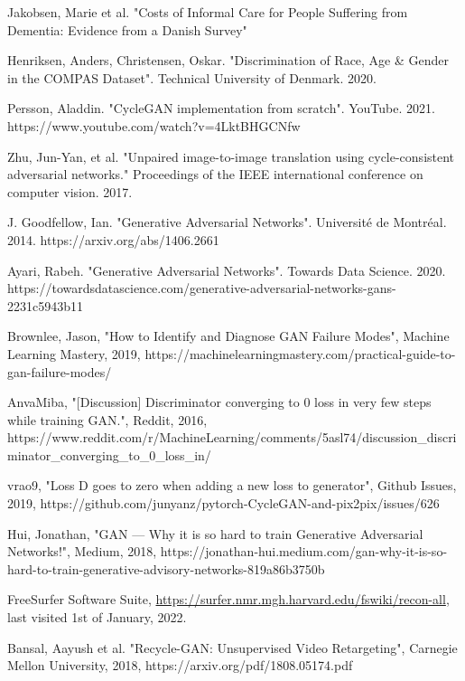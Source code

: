 \documentclass[12pt, fleqn, titlepage]{article}
\begin{document}
\begin{thebibliography}{9}
		 Jakobsen, Marie et al. "Costs of Informal Care for People Suffering from Dementia: Evidence from a Danish Survey"
		
		 Henriksen, Anders, Christensen, Oskar. "Discrimination of Race, Age \& Gender in the COMPAS Dataset". Technical University of Denmark. 2020.
		
		 Persson, Aladdin. "CycleGAN implementation from scratch". YouTube. 2021.  https://www.youtube.com/watch?v=4LktBHGCNfw
	
		 Zhu, Jun-Yan, et al. "Unpaired image-to-image translation using cycle-consistent adversarial networks." Proceedings of the IEEE international conference on computer vision. 2017.
		
		 J. Goodfellow, Ian. "Generative Adversarial Networks". Université de Montréal. 2014. https://arxiv.org/abs/1406.2661
		
		 Ayari, Rabeh. "Generative Adversarial Networks". Towards Data Science. 2020. https://towardsdatascience.com/generative-adversarial-networks-gans-2231c5943b11
		
		 Brownlee, Jason, "How to Identify and Diagnose GAN Failure Modes", Machine Learning Mastery, 2019, https://machinelearningmastery.com/practical-guide-to-gan-failure-modes/
		
		 AnvaMiba, "[Discussion] Discriminator converging to 0 loss in very few steps while training GAN.", Reddit, 2016, https://www.reddit.com/r/MachineLearning/comments/5asl74/discussion\_discriminator\_converging\_to\_0\_loss\_in/
		
		 vrao9, "Loss D goes to zero when adding a new loss to generator", Github Issues, 2019, https://github.com/junyanz/pytorch-CycleGAN-and-pix2pix/issues/626
		
		 Hui, Jonathan, "GAN — Why it is so hard to train Generative Adversarial Networks!", Medium, 2018, https://jonathan-hui.medium.com/gan-why-it-is-so-hard-to-train-generative-advisory-networks-819a86b3750b
		
		 FreeSurfer Software Suite, \url{https://surfer.nmr.mgh.harvard.edu/fswiki/recon-all}, last visited 1st of January, 2022.

		 Bansal, Aayush et al. "Recycle-GAN: Unsupervised Video Retargeting", Carnegie Mellon University, 2018, https://arxiv.org/pdf/1808.05174.pdf
		

\end{thebibliography}
\end{document}
